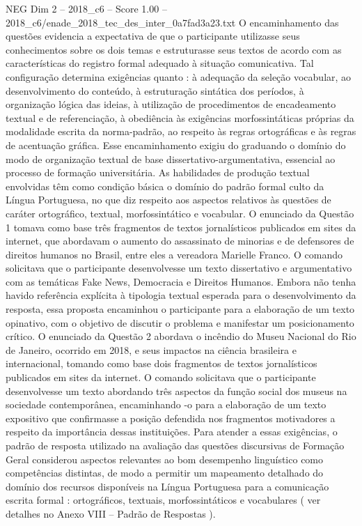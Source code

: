 \begin{textsample}{NEG Dim 2 – 2018\_c6 – Score 1.00 – 2018\_c6/enade\_2018\_tec\_des\_inter\_0a7fad3a23.txt}
O encaminhamento das questões evidencia a expectativa de que o participante utilizasse seus conhecimentos sobre os dois temas e estruturasse seus textos de acordo com as características do registro formal adequado à situação comunicativa.
Tal configuração determina exigências quanto : à adequação da seleção vocabular, ao desenvolvimento do conteúdo, à estruturação sintática dos períodos, à organização lógica das ideias, à utilização de procedimentos de encadeamento textual e de referenciação, à obediência às exigências morfossintáticas próprias da modalidade escrita da norma-padrão, ao respeito às regras ortográficas e às regras de acentuação gráfica.
Esse encaminhamento exigiu do graduando o domínio do modo de organização textual de base dissertativo-argumentativa, essencial ao processo de formação universitária.
As habilidades de produção textual envolvidas têm como condição básica o domínio do padrão formal culto da Língua Portuguesa, no que diz respeito aos aspectos relativos às questões de caráter ortográfico, textual, morfossintático e vocabular.
O enunciado da Questão 1 tomava como base três fragmentos de textos jornalísticos publicados em sites da internet, que abordavam o aumento do assassinato de minorias e de defensores de direitos humanos no Brasil, entre eles a vereadora Marielle Franco.
O comando solicitava que o participante desenvolvesse um texto dissertativo e argumentativo com as temáticas Fake News, Democracia e Direitos Humanos.
Embora não tenha havido referência explícita à tipologia textual esperada para o desenvolvimento da resposta, essa proposta encaminhou o participante para a elaboração de um texto opinativo, com o objetivo de discutir o problema e manifestar um posicionamento crítico.
O enunciado da Questão 2 abordava o incêndio do Museu Nacional do Rio de Janeiro, ocorrido em 2018, e seus impactos na ciência brasileira e internacional, tomando como base dois fragmentos de textos jornalísticos publicados em sites da internet.
O comando solicitava que o participante desenvolvesse um texto abordando três aspectos da função social dos museus na sociedade contemporânea, encaminhando -o para a elaboração de um texto expositivo que confirmasse a posição defendida nos fragmentos motivadores a respeito da importância dessas instituições.
Para atender a essas exigências, o padrão de resposta utilizado na avaliação das questões discursivas de Formação Geral considerou aspectos relevantes ao bom desempenho linguístico como competências distintas, de modo a permitir um mapeamento detalhado do domínio dos recursos disponíveis na Língua Portuguesa para a comunicação escrita formal : ortográficos, textuais, morfossintáticos e vocabulares ( ver detalhes no Anexo VIII – Padrão de Respostas ).

\end{textsample}
